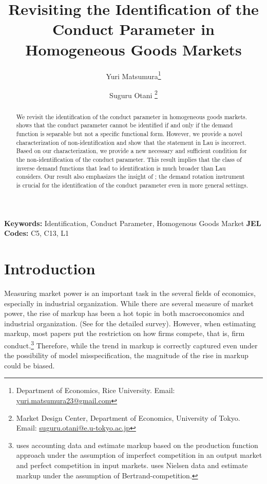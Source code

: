 \documentclass[11pt, a4paper]{article}
\title{Revisiting the Identification of the Conduct Parameter in Homogeneous Goods Markets}
\author{Yuri Matsumura\thanks{Department of Economics, Rice University. Email: \href{mailto:yuri.matsumura23@gmail.com}{yuri.matsumura23@gmail.com}} \and Suguru Otani \thanks{Market Design Center, Department of Economics, University of Tokyo. Email: \href{mailto:suguru.otani@e.u-tokyo.ac.jp}{suguru.otani@e.u-tokyo.ac.jp}
}}
\theoremstyle{remark}
\begin{document}
\maketitle
\begin{abstract}
    We revisit the identification of the conduct parameter in homogeneous goods markets.
    \citet{lau1982identifying} shows that the conduct parameter cannot be identified if and only if the demand function is separable but not a specific functional form.
    However, we provide a novel characterization of non-identification and show that the statement in Lau is incorrect.
    Based on our characterization, we provide a new necessary and sufficient condition for the non-identification of the conduct parameter.
    This result implies that the class of inverse demand functions that lead to identification is much broader than Lau considers.
    Our result also emphasizes the insight of \citet{bresnahan1982oligopoly}; the demand rotation instrument is crucial for the identification of the conduct parameter even in more general settings.
\end{abstract}

\noindent\textbf{Keywords:} Identification, Conduct Parameter, Homogenous Goods Market
\vspace{0in}
\newline
\noindent\textbf{JEL Codes:} C5, C13, L1

\bigskip




\newpage
\section{Introduction}
Measuring market power is an important task in the several fields of economics, especially in industrial organization.
While there are several measure of market power, the rise of markup has been a hot topic in both macroeconomics and industrial organization.
(See \citet{millerIndustrial2025} for the detailed survey).
However, when estimating markup, most papers put the restriction on how firms compete, that is, firm conduct.\footnote{
\citet{deloeckerRise2020} uses accounting data and estimate markup based on the production function approach under the assumption of imperfect competition in an output market and perfect competition in input markets.
\citet{dopperRising} uses Nielsen data and estimate markup under the assumption of Bertrand-competition.}
Therefore, while the trend in markup is correctly captured even under the possibility of model misspecification, the magnitude of the rise in markup could be biased.
\end{document}
